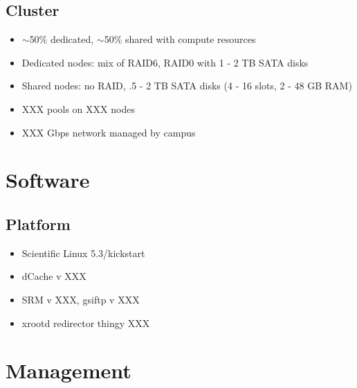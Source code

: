 \documentclass{beamer}
\newcommand{\ca}{\ensuremath{\sim}}
\begin{document}
\subsection{Cluster}
\begin{frame}
\begin{itemize}
	\item \ca{}50\% dedicated, \ca{}50\% shared with compute resources
	\item Dedicated nodes: mix of RAID6, RAID0 with 1 - 2 TB SATA disks
	\item Shared nodes: no RAID, .5 - 2 TB SATA disks (4 - 16 slots, 2 - 48 GB RAM)
	\item XXX pools on XXX nodes
	\item XXX Gbps network managed by campus
\end{itemize}
\end{frame}

\section{Software}
\subsection{Platform}
\begin{frame}
\begin{itemize}
	\item Scientific Linux 5.3/kickstart
	\item dCache v XXX
	\item SRM v XXX, gsiftp v XXX
	\item xrootd redirector thingy XXX
\end{itemize}
\end{frame}

\section{Management}
\end{document}
